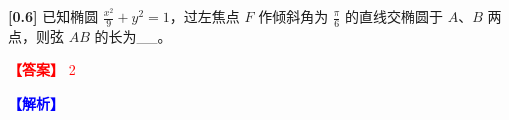 \documentclass[varwidth=16cm, border=2mm]{standalone}
\begin{document}
\textbf{[0.6]} 已知椭圆 $\frac{x^2}{9} + y^2 = 1$，过左焦点 $F$ 作倾斜角为 $\frac{\pi}{6}$ 的直线交椭圆于 $A$、$B$ 两点，则弦 $AB$ 的长为__。

\vspace{0.2cm}\par\noindent\textcolor{red}{\textbf{【答案】} 2}
\par\noindent\textcolor{blue}{\textbf{【解析】} }
\end{document}
